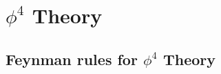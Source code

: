 \chapter{\texorpdfstring{$\phi^4$}{Phi-four} Theory}

\section{Feynman rules for \texorpdfstring{$\phi^4$}{Phi-four} Theory}



